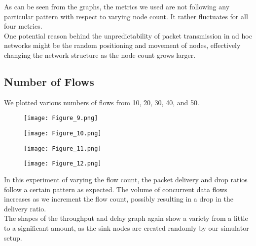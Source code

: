 \documentclass[24pt, a4paper]{article} %
\begin{document}
As can be seen from the graphs, the metrics we used are not following any particular pattern with respect to varying node count. It rather fluctuates for all four metrics. \\ 

One potential reason behind the unpredictability of packet transmission in ad hoc networks might be the random positioning and movement of nodes, effectively changing the network structure as the node count grows larger.


\subsection{Number of Flows}

We plotted various numbers of flows from 10, 20, 30, 40, and 50.

\begin{figure}[H]
    \centering
    \centering\texttt{[image: Figure\_9.png]}
    \label{fig:9}
\end{figure}

\begin{figure}[H]
    \centering
    \centering\texttt{[image: Figure\_10.png]}
    \label{fig:10}
\end{figure}

\begin{figure}[H]
    \centering
    \centering\texttt{[image: Figure\_11.png]}
    \label{fig:11}
\end{figure}

\begin{figure}[H]
    \centering
    \centering\texttt{[image: Figure\_12.png]}
    \label{fig:12}
\end{figure}

In this experiment of varying the flow count, the packet delivery and drop ratios follow a certain pattern as expected. The volume of concurrent data flows increases as we increment the flow count, possibly resulting in a drop in the delivery ratio. \\

The shapes of the throughput and delay graph again show a variety from a little to a significant amount, as the sink nodes are created randomly by our simulator setup.
\end{document}
